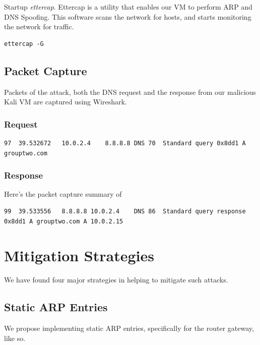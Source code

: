 \documentclass[conference,letterpaper]{IEEEtran}
\begin{document}
Startup \textit{ettercap}. Ettercap\cite{ornaghiEttercapComprehensiveSuite} is a utility that enables our VM to perform ARP\cite{majidhafathimaSurveyNetworkPacket2021} and DNS Spoofing\cite{babuComprehensiveAnalysisSpoofing2011}. This software scans the network for hosts, and starts monitoring the network for traffic.

\begin{lstlisting}
ettercap -G
\end{lstlisting}



\subsection{Packet Capture}
Packets of the attack, both the DNS request and the response from our malicious Kali VM are captured using Wireshark.

\subsubsection{Request}

\begin{lstlisting}
97	39.532672	10.0.2.4	8.8.8.8	DNS	70	Standard query 0x8dd1 A grouptwo.com
\end{lstlisting}

\subsubsection{Response}

Here's the packet capture summary of

\begin{lstlisting}
99	39.533556	8.8.8.8	10.0.2.4	DNS	86	Standard query response 0x8dd1 A grouptwo.com A 10.0.2.15
\end{lstlisting}

\section{Mitigation Strategies}
We have found four major strategies in helping to mitigate such attacks.

\subsection{Static ARP Entries}

We propose implementing static ARP entries, specifically for the router gateway, like so.
\end{document}
